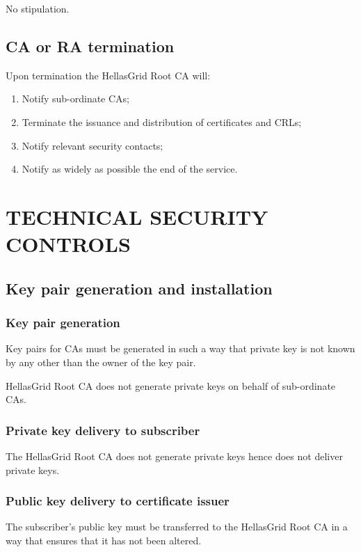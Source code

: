 \documentclass[11pt,a4paper,titlepage]{book}
\begin{document}
No stipulation.

\section{CA or RA termination}

Upon termination the HellasGrid Root CA will:

\begin{enumerate}
\item{Notify sub-ordinate CAs;}
\item{Terminate the issuance and distribution of certificates and CRLs;}
\item{Notify relevant security contacts;}
\item{Notify as widely as possible the end of the service.}
\end{enumerate}


\chapter{TECHNICAL SECURITY CONTROLS}
\section{Key pair generation and installation}
\subsection{Key pair generation}

Key pairs for CAs must be generated in such a way that private key is not known by any other than the owner of the key pair.

HellasGrid Root CA does not generate private keys on behalf of sub-ordinate CAs.



\subsection{Private key delivery to subscriber}


The HellasGrid Root CA does not generate private keys hence does not deliver private keys.


\subsection{Public key delivery to certificate issuer}


The subscriber's public key must be transferred to the HellasGrid Root CA in a way that ensures that it has not been altered.
\end{document}
